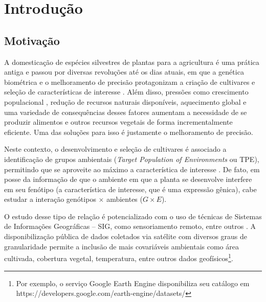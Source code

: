 \documentclass[12pt, a4paper, twoside]{report}
\numberwithin{equation}{subsection} %
\begin{document}
\newpage

\listoffigures

\newpage

\tableofcontents

\newpage

\setcounter{page}{8}

\chapter{Introdução}

\section{Motivação}

A domesticação de espécies silvestres de plantas para a agricultura é uma prática antiga e passou por diversas revoluções até os dias atuais, em que a genética biométrica e o melhoramento de precisão protagonizam a criação de cultivares e seleção de características de interesse \cite{melhora_precisa1}. Além disso, pressões como crescimento populacional \cite{hickey2019breeding}, redução de recursos naturais disponíveis, aquecimento global e uma variedade de consequências desses fatores \cite{jorasch2019} aumentam a necessidade de se produzir alimentos e outros recursos vegetais de forma incrementalmente eficiente. Uma das soluções para isso é justamente o melhoramento de precisão.

Neste contexto, o desenvolvimento e seleção de cultivares é associado a identificação de grupos ambientais (\textit{Target Population of Environments} ou TPE), permitindo que se aproveite ao máximo a característica de interesse \cite{chenu2015characterizing}. De fato, em posse da informação de que o ambiente em que a planta se desenvolve interfere em seu fenótipo (a característica de interesse, que é uma expressão gênica), cabe estudar a interação genótipos $\times$ ambientes ($G \times E$).

O estudo desse tipo de relação é potencializado com o uso de técnicas de Sistemas de Informações Geográficas -- SIG, como sensoriamento remoto, entre outros \cite{melhora_precisa1}. A disponibilização pública de dados coletados via satélite com diversos graus de granularidade permite a inclusão de mais covariáveis ambientais como área cultivada, cobertura vegetal, temperatura, entre outros dados geofísicos\footnote{Por exemplo, o serviço Google Earth Engine disponibiliza seu catálogo em https://developers.google.com/earth-engine/datasets/}.
\end{document}
